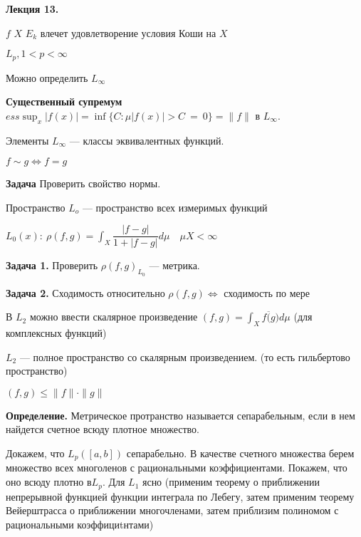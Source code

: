 

\begin{center} \textbf{Лекция 13.} \end{center}

\textbf{} \quad $f$ $X$ $E_k$
%
%
%
%
%
%
%
%
%
%
%
влечет удовлетворение условия Коши на $X$

$L_p, 1 < p < \infty$

Можно определить $L_\infty$

\textbf{Существенный супремум} \quad  $ ess \sup_x|f(x)| =
\inf\{C: \mu{|f(x)|> C}~=~0\} = \|f\|$ в $L_\infty$.

Элементы $L_\infty$ --- классы эквивалентных функций.

$f \sim g \Leftrightarrow f = g$

\textbf{Задача} \quad Проверить свойство нормы.

Пространство $L_o$ --- пространство всех измеримых функций

$L_0(x): \: \rho(f,g) = \int_X \dfrac{|f-g|}{1 + |f-g|} d \mu
\quad \mu X < \infty$

\textbf{Задача 1.} \quad Проверить $\rho(f,g)_{L_0}$ --- метрика.

\textbf{Задача 2.} \quad Сходимость относительно $\rho(f,g)
\Leftrightarrow$ сходимость по мере

В $L_2$ можно ввести скалярное произведение $(f,g) = \int_X f
\overline(g) d \mu$ (для комплексных функций)

$L_2$ --- полное пространство со скалярным произведением. (то есть
гильбертово пространство)

$(f,g) \leqslant \|f\|\cdot \|g\|$

\textbf{Определение.} \quad Метрическое протранство называется
сепарабельным, если в нем найдется счетное всюду плотное
множество.

Докажем, что $L_p([a,b])$ сепарабельно. В качестве счетного
множества берем множество всех многоленов с рациональными
коэффициентами. Покажем, что оно всюду плотно в$L_p$. Для $L_1$
ясно (применим теорему о приближении непрерывной функцией функции
интеграла по Лебегу, затем применим теорему Вейерштрасса о
приближении многочленами, затем приблизим полиномом с
рациональными коэффициtнтами)

